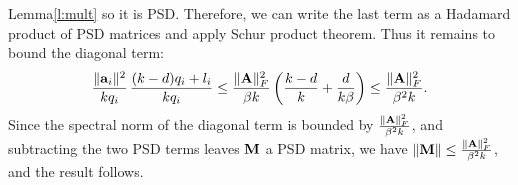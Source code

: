 \documentclass[12pt]{sty/colt2019/colt2018-arxiv}
\begin{document}
\begin{proofof}{Lemma}{\ref{l:mult}}
so it is PSD.
Therefore, we can write the last term as a Hadamard product of
PSD matrices and apply Schur product theorem. Thus it remains to bound
the diagonal term: 
\begin{align*}
  \frac{\|\mathbf a_i\|^2}{kq_i}\,\frac{(k-d)q_i+l_i}{kq_i}\leq
  \frac{\|\mathbf A\|_F^2}{\beta k} \, \bigg(\frac{k-d}{k} +
  \frac{d}{k\beta}\bigg)\leq  \frac{\|\mathbf A\|_F^2}{\beta^2 k}.
\end{align*}
Since the spectral norm of the diagonal term is bounded by $\frac{\|\mathbf A\|_F^2}{\beta^2 k}$,
and subtracting the two PSD terms leaves $\mathbf M$ a PSD matrix, we have
${\| \mathbf M \|} \le \frac{\|\mathbf A\|_F^2}{\beta^2 k}$, and the result follows.
\end{proofof}
\end{document}

